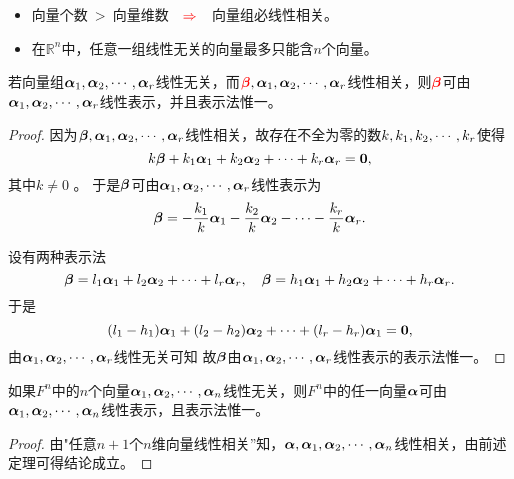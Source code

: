 \begin{zhu*}
  \begin{itemize}
  \item    向量个数$~>~$向量维数 $~~\red{\Rightarrow}~~$ 向量组必线性相关。 
  \item     在$\mathbb R^n$中，任意一组线性无关的向量最多只能含$n$个向量。
  \end{itemize}
\end{zhu*}

\begin{dingli}
  若向量组$\alphabd_1,\alphabd_2,\cd,\alphabd_r$线性无关，而$\red{\betabd},\alphabd_1,\alphabd_2,\cd,\alphabd_r$线性相关，则$\red{\betabd}$可由$\alphabd_1,\alphabd_2,\cd,\alphabd_r$线性表示，并且表示法惟一。
\end{dingli}
\begin{proof}
因为$\betabd,\alphabd_1,\alphabd_2,\cd,\alphabd_r$线性相关，故存在不全为零的数$k,k_1,k_2,\cd,k_r$使得
$$
k\betabd + k_1\alphabd_1+k_2\alphabd_2+\cd+k_r\alphabd_r=\zero,
$$
其中$k\ne 0 $ 。  
于是$\betabd$可由$\alphabd_1,\alphabd_2,\cd,\alphabd_r$线性表示为
$$
\betabd=-\frac{k_1}k\alphabd_1-\frac{k_2}k\alphabd_2-\cd-\frac{k_r}k\alphabd_r.
$$

 \quad 设有两种表示法
$$
\betabd=l_1\alphabd_1+l_2\alphabd_2+\cd+l_r\alphabd_r,\quad
\betabd=h_1\alphabd_1+h_2\alphabd_2+\cd+h_r\alphabd_r.
$$ 
于是
$$
(l_1-h_1)\alphabd_1+(l_2-h_2)\alphabd_2+\cd+(l_r-h_r)\alphabd_1=\zero,
$$ 
由$\alphabd_1,\alphabd_2,\cd,\alphabd_r$线性无关可知
故$\betabd$由$\alphabd_1,\alphabd_2,\cd,\alphabd_r$线性表示的表示法惟一。

\end{proof}

\begin{tuilun}
  如果$F^n$中的$n$个向量$\alphabd_1,\alphabd_2,\cd,\alphabd_n$线性无关，则$F^n$中的任一向量$\alphabd$可由$\alphabd_1,\alphabd_2,\cd,\alphabd_n$线性表示，且表示法惟一。
\end{tuilun}
\begin{proof}
由"任意$n+1$个$n$维向量线性相关''知，$\alphabd,\alphabd_1,\alphabd_2,\cd,\alphabd_n$线性相关，由前述定理可得结论成立。
\end{proof}




